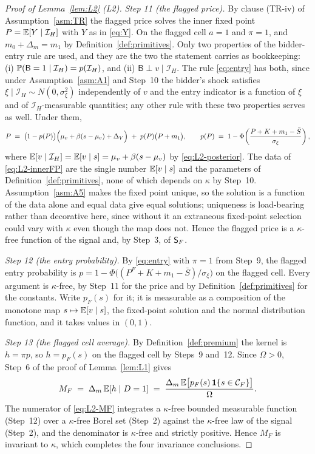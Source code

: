 \begin{proof}[Proof of Lemma~\ref{lem:L2} (L2)]
\emph{Step 11 (the flagged price).} By clause (TR-iv) of Assumption~\ref{asm:TR} the flagged price
solves the inner fixed point $P = \mathbb{E}[Y \mid \mathcal I_H]$ with $Y$ as in \eqref{eq:Y}. On the
flagged cell $a=1$ and $\pi=1$, and $m_0 + \Delta_m = m_1$ by Definition~\ref{def:primitives}. Only
two properties of the bidder-entry rule are used, and they are the two the statement carries as
bookkeeping: (i) $\mathbb{P}(\mathsf B = 1 \mid \mathcal I_H) = p(\mathcal I_H)$, and (ii)
$\mathsf B \perp v \mid \mathcal I_H$. The rule \eqref{eq:entry} has both, since under
Assumption~\ref{asm:A1} and Step~10 the bidder's shock satisfies
$\xi \mid \mathcal I_H \sim N(0,\sigma_\xi^2)$ independently of $v$ and the entry indicator is a
function of $\xi$ and of $\mathcal I_H$-measurable quantities; any other rule with these two
properties serves as well. Under them,
\begin{equation}
\label{eq:L2-innerFP}
P \;=\; \bigl(1-p(P)\bigr)\Bigl(\mu_v+\beta(s-\mu_v)+\Delta_V\Bigr) \;+\; p(P)\bigl(P+m_1\bigr),
\qquad
p(P) \;=\; 1-\Phi\!\left(\frac{P+K+m_1-\bar S}{\sigma_\xi}\right),
\end{equation}
where $\mathbb{E}[v \mid \mathcal I_H] = \mathbb{E}[v \mid s] = \mu_v+\beta(s-\mu_v)$ by
\eqref{eq:L2-posterior}. The data of \eqref{eq:L2-innerFP} are the single number $\mathbb{E}[v \mid s]$ and
the parameters of Definition~\ref{def:primitives}, none of which depends on $\kappa$ by Step~10.
Assumption~\ref{asm:A5} makes the fixed point unique, so the solution is a function of the data
alone and equal data give equal solutions; uniqueness is load-bearing rather than decorative here,
since without it an extraneous fixed-point selection could vary with $\kappa$ even though the map
does not. Hence the flagged price is a $\kappa$-free function of the signal and, by Step~3, of
$\mathsf{S}_F$.

\emph{Step 12 (the entry probability).} By \eqref{eq:entry} with $\pi = 1$ from Step~9, the flagged
entry probability is $p = 1-\Phi\bigl((P^F+K+m_1-\bar S)/\sigma_\xi\bigr)$ on the flagged cell. Every
argument is $\kappa$-free, by Step~11 for the price and by Definition~\ref{def:primitives} for the
constants. Write $p_F(s)$ for it; it is measurable as a composition of the monotone map
$s \mapsto \mathbb{E}[v \mid s]$, the fixed-point solution and the normal distribution function, and it
takes values in $(0,1)$.

\emph{Step 13 (the flagged cell average).} By Definition~\ref{def:premium} the kernel is
$h = \pi p$, so $h = p_F(s)$ on the flagged cell by Steps~9 and~12. Since $\Omega > 0$, Step~6 of the
proof of Lemma~\ref{lem:L1} gives
\begin{equation}
\label{eq:L2-MF}
M_F \;=\; \Delta_m\,\mathbb{E}[h \mid D=1]
     \;=\; \frac{\Delta_m\,\mathbb{E}\bigl[p_F(s)\,\mathbf{1}\{s \in \mathcal C_F\}\bigr]}{\Omega} .
\end{equation}
The numerator of \eqref{eq:L2-MF} integrates a $\kappa$-free bounded measurable function (Step~12)
over a $\kappa$-free Borel set (Step~2) against the $\kappa$-free law of the signal (Step~2), and the
denominator is $\kappa$-free and strictly positive. Hence $M_F$ is invariant to $\kappa$, which
completes the four invariance conclusions.


\end{proof}
